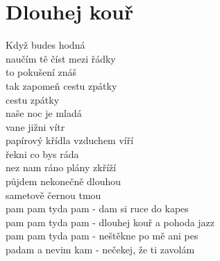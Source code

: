 \section{Dlouhej kouř}
\onehalfspacing

Když  budes hodná\\
naučím tě číst  mezi  řádky\\
to pokušení  znáš\\
tak  zapomeň cestu  zpátky\\
cestu  zpátky\\

naše noc je mladá\\
vane jižni  vítr\\
papírový  křídla  vzduchem  víří\\
řekni co bys ráda\\
nez nam ráno plány  zkříží\\
půjdem  nekonečně  dlouhou\\
sametově černou  tmou\\

pam pam tyda pam -  dam si ruce  do  kapes\\
pam pam tyda pam -  dlouhej kouř  a  pohoda jazz\\
pam pam tyda pam - neštěkne po mě ani  pes\\
padam a nevim kam -  nečekej, že  ti zavolám\\



